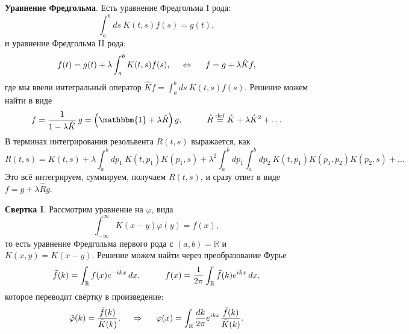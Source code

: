 





\textbf{Уравнение Фредгольма}. Есть уравнение Фредгольма I рода:
\begin{equation*}
	\int_{a}^{b} ds\ K(t, s) f(s) = g(t),
\end{equation*}
и уравнение Фредгольма II рода:
\begin{equation}
	f(t) = g(t) + \lambda \int_{a}^{b} K(t, s) f(s),
	\hspace{5 mm} \Leftrightarrow \hspace{5 mm} 
	f = g + \lambda \hat{K} f,
	\label{Feq2}
\end{equation}
где мы ввели интегральный оператор $\hat{K} f = \int_{a}^{b} ds \ K(t, s) f(s)$. Решение можем найти в виде
\begin{equation*}
	f = \frac{1}{1-\lambda \hat{K}}\,  g = \left(\mathbbm{1} + \lambda \hat{R}\right) g,
	\hspace{10 mm} 
	\hat{R} \overset{\mathrm{def}}{=}  \hat{K} + \lambda \hat{K}^2 + \ldots
\end{equation*}
В терминах интегрирования резольвента $R (t, s)$ выражается, как
\begin{equation}
	R(t,s) = K(t, s) + \lambda \int_{a}^{b}d p_1\  K(t, p_1) K(p_1, s) + 
	\lambda^2 \int_{a}^{b} d p_1 \int_{a}^{b} d p_2 \ K(t, p_1) K(p_1, p_2) K(p_2, s) + \ldots
	\label{FeqRI}
\end{equation}
Это всё интегрируем, суммируем, получаем $R(t, s)$, и сразу ответ в виде $f = g + \lambda \hat{R} g$.




\textbf{Свертка I}. Рассмотрим уравнение на $\varphi$, вида
\begin{equation}
	\int_{-\infty}^{\infty} K(x-y) \varphi(y) = f(x),
\end{equation}
то есть уравнение Фредгольма первого рода с $(a, b) = \mathbb{R}$
 и $K(x,y) = K(x-y)$. 
Решение можем найти через преобразование Фурье 
\begin{equation*}
	\tilde{f}(k) = \int_{\mathbb{R}} f(x) e^{-ikx} \d x,
	\hspace{10 mm} 
	f(x) = \frac{1}{2 \pi}\int_{\mathbb{R}} \tilde{f} (k) e^{i k x} \d x,
\end{equation*}
которое переводит свёртку в произведение:
\begin{equation}
	\tilde{\varphi}(k) = \frac{\tilde{f}(k)}{\tilde{K}(k)},
	\hspace{0.5cm} \Rightarrow \hspace{0.5cm}
	 \varphi(x) = \int_{\mathbb{R}} \frac{dk}{2\pi} e^{ikx} \frac{\tilde{f}(k)}{\tilde{K}(k)}.
\end{equation}

